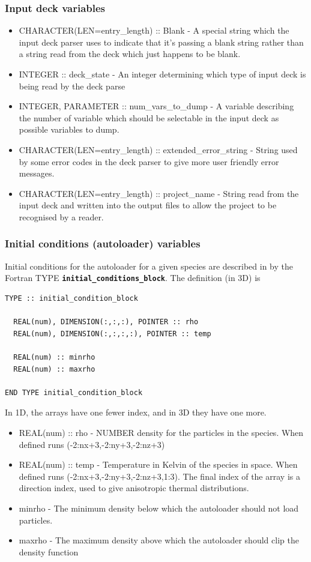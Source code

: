 \documentclass[12pt,a4paper]{article}
\newcommand{\simpleboxverbatim}{\begin{Verbatim}[obeytabs=true,frame=single,
  framerule=0.5mm,rulecolor=\color{warwickmid},formatcom=\color{black}]}
\newcommand{\inlinecode}[1]{{\color{warwickred} \bf\texttt{#1}}}
\newcommand{\EPOCH}{{\color{warwickdark}\fontfamily{phv}\selectfont{EPOCH}}}
\begin{document}
\subsubsection{Input deck variables}
\begin{itemize}
\item CHARACTER(LEN=entry\_length) :: Blank - A special string which the input
  deck parser uses to indicate that it's passing a blank string rather than a
  string read from the deck which just happens to be blank.
\item INTEGER :: deck\_state - An integer determining which type of input deck
  is being read by the deck parse
\item INTEGER, PARAMETER :: num\_vars\_to\_dump - A variable describing the
  number of variable which should be selectable in the input deck as possible
  variables to dump.
\item CHARACTER(LEN=entry\_length) :: extended\_error\_string - String used by
  some error codes in the deck parser to give more user friendly error
  messages.
\item CHARACTER(LEN=entry\_length) :: project\_name - String read from the
  input deck and written into the output files to allow the project to be
  recognised by a reader.
\end{itemize}

\subsubsection{Initial conditions (autoloader) variables}
Initial conditions for the autoloader for a given species are described in
{\EPOCH} by the Fortran TYPE \inlinecode{initial\_conditions\_block}. The
definition (in 3D) is

\simpleboxverbatim
TYPE :: initial_condition_block

  REAL(num), DIMENSION(:,:,:), POINTER :: rho
  REAL(num), DIMENSION(:,:,:,:), POINTER :: temp

  REAL(num) :: minrho
  REAL(num) :: maxrho

END TYPE initial_condition_block
\end{Verbatim}

In 1D, the arrays have one fewer index, and in 3D they have one more.
\begin{itemize}
\item REAL(num) :: rho - NUMBER density for the particles in the species. When
  defined runs (-2:nx+3,-2:ny+3,-2:nz+3)
\item REAL(num) :: temp - Temperature in Kelvin of the species in space. When
  defined runs (-2:nx+3,-2:ny+3,-2:nz+3,1:3). The final index of the array
  is a direction index, used to give anisotropic thermal distributions.
\item minrho - The minimum density below which the autoloader should not load
  particles.
\item maxrho - The maximum density above which the autoloader should clip the
  density function
\end{itemize}
\end{document}
